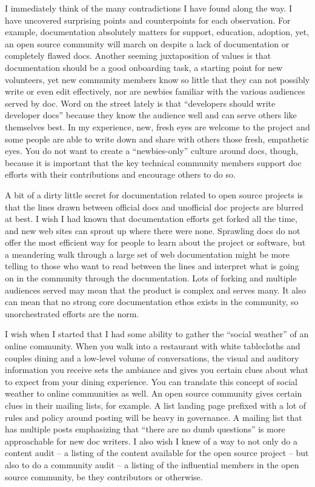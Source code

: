 I immediately think of the many contradictions I have found along the way. I
have uncovered surprising points and counterpoints for each observation. For
example, documentation absolutely matters for support, education, adoption, yet,
an open source community will march on despite a lack of documentation or
completely flawed docs. Another seeming juxtaposition of values is that
documentation should be a good onboarding task, a starting point for new
volunteers, yet new community members know so little that they can not possibly
write or even edit effectively, nor are newbies familiar with the various
audiences served by doc. Word on the street lately is that ``developers should
write developer docs'' because they know the audience well and can serve others
like themselves best. In my experience, new, fresh eyes are welcome to the
project and some people are able to write down and share with others those
fresh, empathetic eyes. You do not want to create a ``newbies-only'' culture
around docs, though, because it is important that the key technical community
members support doc efforts with their contributions and encourage others to do
so. 

A bit of a dirty little secret for documentation related to open source projects
is that the lines drawn between official docs and unofficial doc projects are
blurred at best. I wish I had known that documentation efforts get forked all
the time, and new web sites can sprout up where there were none. Sprawling docs
do not offer the most efficient way for people to learn about the project or
software, but a meandering walk through a large set of web documentation might
be more telling to those who want to read between the lines and interpret what
is going on in the community through the documentation. Lots of forking and
multiple audiences served may mean that the product is complex and serves many.
It also can mean that no strong core documentation ethos exists in the
community, so unorchestrated efforts are the norm. 

I wish when I started that I had some ability to gather the ``social weather''
of an online community. When you walk into a restaurant with white tablecloths
and couples dining and a low-level volume of conversations, the visual and
auditory information you receive sets the ambiance and gives you certain clues
about what to expect from your dining experience. You can translate this concept
of social weather to online communities as well. An open source community gives
certain clues in their mailing lists, for example. A list landing page prefixed
with a lot of rules and policy around posting will be heavy in governance. A
mailing list that has multiple posts emphasizing that ``there are no dumb
questions'' is more approachable for new doc writers. I also wish I knew of a
way to not only do a content audit -- a listing of the content available for the
open source project -- but also to do a community audit -- a listing of the
influential members in the open source community, be they contributors or
otherwise.

